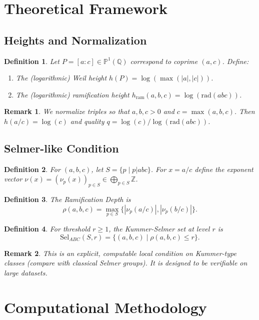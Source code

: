 \documentclass[11pt,a4paper]{article}
\newtheorem{definition}{Definition}[section]
\newtheorem{remark}{Remark}[section]
\newcommand{\Q}{\mathbb{Q}}
\newcommand{\Z}{\mathbb{Z}}
\newcommand{\Pp}{\mathbb{P}}
\newcommand{\rad}{\mathrm{rad}}
\newcommand{\Sel}{\mathrm{Sel}}
\begin{document}
\section{Theoretical Framework}

\subsection{Heights and Normalization}
\begin{definition}
Let $P=[a:c]\in\Pp^1(\Q)$ correspond to coprime $(a,c)$. Define:
\begin{enumerate}
    \item The (logarithmic) Weil height $h(P)=\log(\max(|a|,|c|))$.
    \item The (logarithmic) ramification height $h_{\mathrm{ram}}(a,b,c)=\log(\rad(abc))$.
\end{enumerate}
\end{definition}

\begin{remark}
We normalize triples so that $a,b,c>0$ and $c=\max(a,b,c)$. Then $h(a/c)=\log(c)$ and quality $q=\log(c)/\log(\rad(abc))$.
\end{remark}

\subsection{Selmer-like Condition}
\begin{definition}
For $(a,b,c)$, let $S=\{p\mid p|abc\}$. For $x=a/c$ define the exponent vector $\nu(x)=(\nu_p(x))_{p\in S}\in\bigoplus_{p\in S}\Z$.
\end{definition}

\begin{definition}
The Ramification Depth is
\[
\rho(a,b,c)=\max_{p\in S}\{|\nu_p(a/c)|,|\nu_p(b/c)|\}.
\]
\end{definition}

\begin{definition}
For threshold $r\ge1$, the Kummer-Selmer set at level $r$ is
\[
\Sel_{ABC}(S,r)=\{(a,b,c)\mid \rho(a,b,c)\le r\}.
\]
\end{definition}

\begin{remark}
This is an explicit, computable local condition on Kummer-type classes (compare with classical Selmer groups). It is designed to be verifiable on large datasets.
\end{remark}

\section{Computational Methodology}
\end{document}
